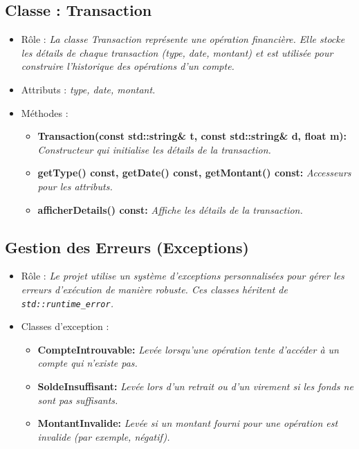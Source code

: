 \subsection{Classe : Transaction }
\begin{itemize}[leftmargin=*]
\item Rôle : \textit{La classe Transaction représente une opération financière. Elle stocke les détails de chaque transaction (type, date, montant) et est utilisée pour construire l'historique des opérations d'un compte.}
\item Attributs : \textit{type, date, montant.}
\item Méthodes : 
     \begin{itemize}[leftmargin=*]
      \item \textbf{Transaction(const std::string& t, const std::string& d, float m):} \textit{Constructeur qui initialise les détails de la transaction.}
      \item \textbf{getType() const, getDate() const, getMontant() const:} \textit{Accesseurs pour les attributs.}
      \item \textbf{afficherDetails() const:} \textit{Affiche les détails de la transaction.}
      \end{itemize}
\end{itemize}

\subsection{Gestion des Erreurs (Exceptions)}
\begin{itemize}[leftmargin=*]
\item Rôle : \textit{Le projet utilise un système d'exceptions personnalisées pour gérer les erreurs d'exécution de manière robuste. Ces classes héritent de \texttt{std::runtime\_error}.}
\item Classes d'exception : 
     \begin{itemize}[leftmargin=*]
      \item \textbf{CompteIntrouvable:} \textit{Levée lorsqu'une opération tente d'accéder à un compte qui n'existe pas.}
      \item \textbf{SoldeInsuffisant:} \textit{Levée lors d'un retrait ou d'un virement si les fonds ne sont pas suffisants.}
      \item \textbf{MontantInvalide:} \textit{Levée si un montant fourni pour une opération est invalide (par exemple, négatif).}
      \end{itemize}
\end{itemize}

